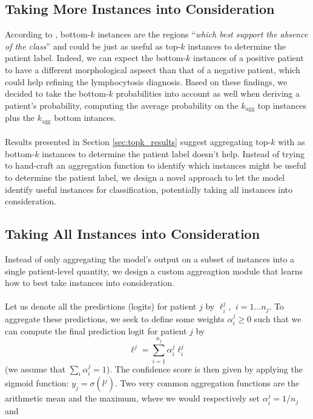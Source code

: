 \documentclass[final]{cvpr}
\begin{document}
	\subsection{Taking More Instances into Consideration}
	\label{topbottom}
	
	According to \cite{owkin}, bottom-$k$ instances are the regions “\textit{which best support the absence of the class}” and could be just as useful as top-$k$ instances to determine the patient label. Indeed, we can expect the bottom-$k$ instances of a positive patient to have a different morphological aspsect than that of a negative patient, which could help refining the lymphocytosis diagnosis. Based on these findings, we decided to take the bottom-$k$ probabilities into account as well when deriving a patient's probability, computing the average probability on the $k_{\text{agg}}$ top instances plus the $k_{\text{agg}}$ bottom intances.\\
	\\
	Results presented in Section \ref{sec:topk_results} suggest aggregating top-$k$ with as bottom-$k$ instances to determine the patient label doesn't help. Instead of trying to hand-craft an aggregation function to identify which instances might be useful to determine the patient label, we design a novel approach to let the model identify useful instances for classification, potentially taking all instances into consideration.
	
	\subsection{Taking All Instances into Consideration}
	\label{sec:custom}
	
	Instead of only aggregating the model's output on a subset of instances into a single patient-level quantity, we design a custom aggreagtion module that learns how to best take instances into consideration.\\
	\\
	Let us denote all the predictions (logits) for patient $j$ by $\ell_i^j$, $\: i=1 \dots n_j$.
	To aggregate these predictions, we seek to define some weights $\alpha_i^j \geq 0$ such that we can compute the final prediction logit for patient $j$ by
	$$\ell^j = \sum_{i=1}^{n_j} \alpha_i^j \ell_i^j$$
	(we assume that $\sum_i \alpha_i^j = 1$).
	The confidence score is then given by applying the sigmoid function: $y_j = \sigma(l^j)$.
	Two very common aggregation functions are the arithmetic mean and the maximum, where we would respectively set $\alpha_i^j = 1/n_j$ and 
	
\end{document}
